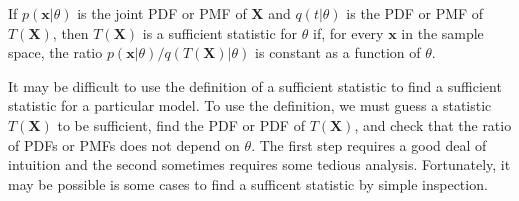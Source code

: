 \begin{theorem}
If $p(\mathbf{x}|\theta)$ is the joint PDF or PMF of $\mathbf{X}$ and $q(t|\theta)$ is the PDF or PMF of $T(\mathbf{X})$, then $T(\mathbf{X})$ is a sufficient statistic for $\theta$ if, for every $\mathbf{x}$ in the sample space, the ratio $p(\mathbf{x}|\theta)/q(T(\mathbf{X})|\theta)$ is constant as a function of $\theta$.
\end{theorem}

It may be difficult to use the definition of a sufficient statistic to find a sufficient statistic for a particular model.
To use the definition, we must guess a statistic $T(\mathbf{X})$ to be sufficient, find the PDF or PDF of $T(\mathbf{X})$, and check that the ratio of PDFs or PMFs does not depend on $\theta$.
The first step requires a good deal of intuition and the second sometimes requires some tedious analysis.
Fortunately, it may be possible is some cases to find a sufficent statistic by simple inspection.

